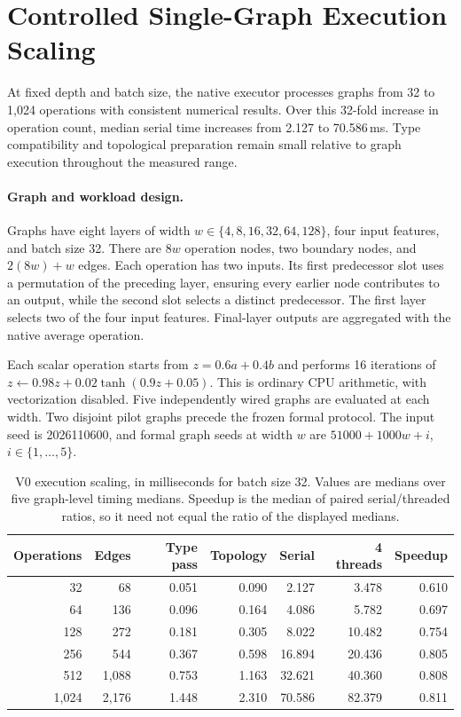 \section{Controlled Single-Graph Execution Scaling}
\label{app:revision_scaling}

At fixed depth and batch size, the native executor processes graphs from 32 to
1,024 operations with consistent numerical results. Over this 32-fold increase
in operation count, median serial time increases from 2.127 to 70.586\,ms.
Type compatibility and topological preparation remain small relative to graph
execution throughout the measured range.

\paragraph{Graph and workload design.}
Graphs have eight layers of width $w\in\{4,8,16,32,64,128\}$, four input
features, and batch size 32. There are $8w$ operation nodes, two boundary nodes,
and $2(8w)+w$ edges. Each operation has two inputs. Its first predecessor slot
uses a permutation of the preceding layer, ensuring every earlier node
contributes to an output, while the second slot selects a distinct predecessor.
The first layer selects two of the four input features. Final-layer outputs
are aggregated with the native average operation.

Each scalar operation starts from $z=0.6a+0.4b$ and performs 16 iterations of
$z\leftarrow0.98z+0.02\tanh(0.9z+0.05)$. This is ordinary CPU arithmetic,
with vectorization disabled. Five independently wired graphs are evaluated at
each width. Two disjoint pilot graphs precede the frozen formal protocol.
The input seed is 2026110600, and formal graph seeds at width $w$ are
$51000+1000w+i$, $i\in\{1,\ldots,5\}$.

\begin{table}[tb]
\centering
\small
\caption{V0 execution scaling, in milliseconds for batch size 32. Values are
medians over five graph-level timing medians. Speedup is the median of paired
serial/threaded ratios, so it need not equal the ratio of the displayed medians.}
\label{tab:revision_scaling_full}
\begin{tabular}{rrrrrrr}
\toprule
Operations & Edges & Type pass & Topology & Serial & 4 threads & Speedup \\
\midrule
32 & 68 & 0.051 & 0.090 & 2.127 & 3.478 & 0.610 \\
64 & 136 & 0.096 & 0.164 & 4.086 & 5.782 & 0.697 \\
128 & 272 & 0.181 & 0.305 & 8.022 & 10.482 & 0.754 \\
256 & 544 & 0.367 & 0.598 & 16.894 & 20.436 & 0.805 \\
512 & 1,088 & 0.753 & 1.163 & 32.621 & 40.360 & 0.808 \\
1,024 & 2,176 & 1.448 & 2.310 & 70.586 & 82.379 & 0.811 \\
\bottomrule
\end{tabular}
\end{table}

